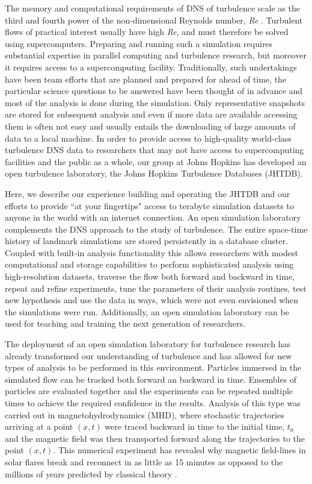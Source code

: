 \documentclass[10pt,twocolumn]{article}
\begin{document}
The memory and computational requirements of DNS of turbulence scale as the third and fourth power of the
non-dimensional Reynolds number, \emph{Re} \cite{Lee}. Turbulent flows of practical interest usually have high
\emph{Re}, and must therefore be solved using supercomputers. Preparing and running such a simulation requires substantial expertise in parallel
computing and turbulence research, but moreover it requires access to a supercomputing facility. Traditionally, such undertakings have been team 
efforts that are planned and prepared for ahead of time, the particular science questions to be answered have been thought of in advance and most of the
analysis is done during the simulation. Only representative snapshots are stored for subsequent analysis and even if more data are available accessing
them is often not easy and usually entails the downloading of large amounts of data to a local machine. In order to provide access to high-quality
world-class turbulence DNS data to researchers that may not have access to supercomputing facilities and the public as a whole, our group at Johns 
Hopkins has developed an open turbulence laboratory, the Johns Hopkins Turbulence Databases (JHTDB). 

Here, we describe our experience building and operating the JHTDB and our efforts to provide ``at your fingertips" access to terabyte simulation datasets
to anyone in the world with an internet connection. An open simulation laboratory complements the DNS approach to the study of turbulence. The entire
space-time history of landmark simulations are stored persistently in a database cluster. Coupled with built-in analysis functionality this allows researchers
with modest computational and storage capabilities to perform sophisticated analysis using high-resolution datasets, traverse the flow both forward and
backward in time, repeat and refine experiments, tune the parameters of their analysis routines, test new hypothesis and use the data in ways, which were 
not even envisioned when the simulations were run. Additionally, an open simulation laboratory can be used for teaching and training the next generation 
of researchers.

The deployment of an open simulation laboratory for turbulence research has already transformed our understanding of turbulence and has allowed for new
types of analysis to be performed in this environment. Particles immersed in the simulated flow can be tracked both forward an backward in time. 
Ensembles of particles are evaluated together and the experiments can be repeated multiple times to achieve the required confidence in the results.
Analysis of this type was carried out in magnetohydrodynamics (MHD), where stochastic trajectories arriving at a point $(x, t)$ were traced backward in 
time to the initial time, $t_0$ and the magnetic field was then transported forward along the trajectories to the point $(x, t)$. This numerical experiment has
revealed why magnetic field-lines in solar flares break and reconnect in as little as 15 minutes as opposed to the millions of years predicted by classical 
theory \cite{Eyink}.
\end{document}
